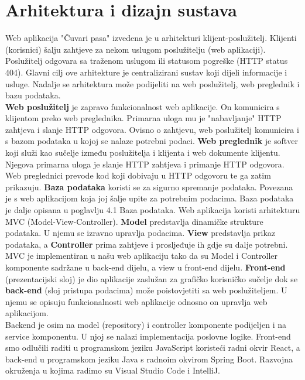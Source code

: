 \chapter{Arhitektura i dizajn sustava}

		Web aplikacija "Čuvari pasa" izvedena je u arhitekturi klijent-poslužitelj. Klijenti (korisnici) šalju zahtjeve za nekom uslugom poslužitelju (web aplikaciji). Poslužitelj odgovara sa traženom uslugom ili statusom pogreške (HTTP status 404). Glavni cilj ove arhitekture je centralizirani sustav koji dijeli informacije i usluge.
		Nadalje se arhitektura može podijeliti na web poslužitelj, web preglednik i bazu podataka.\\
		\newline
		\textbf{Web poslužitelj} je zapravo funkcionalnost web aplikacije. On komunicira s klijentom preko web preglednika. Primarna uloga mu je "nabavljanje" HTTP zahtjeva i slanje HTTP odgovora. Ovisno o zahtjevu, web poslužitelj komunicira i s bazom podataka u kojoj se nalaze potrebni podaci. 
		\newline
		\textbf{Web preglednik} je softver koji služi kao sučelje između poslužitelja i klijenta i web dokumente klijentu. Njegova primarna uloga je slanje HTTP zahtjeva i primanje HTTP odgovora. Web preglednici prevode kod koji dobivaju u HTTP odgovoru te ga zatim prikazuju.
		\newline
		\textbf{Baza podataka} koristi se za sigurno spremanje podataka. Povezana je s web aplikacijom koja joj šalje upite za potrebnim podacima. Baza podataka je dalje opisana u poglavlju 4.1 Baza podataka.
		\newline
		\newline
		Web aplikacija koristi arhitekturu MVC (Model-View-Controller). \textbf{Model} predstavlja dinamičke strukture podataka. U njemu se izravno upravlja podacima.
		\textbf{View} predstavlja prikaz podataka, a \textbf{Controller} prima zahtjeve i prosljeđuje ih gdje su dalje potrebni. MVC je implementiran u našu web aplikaciju tako da su Model i Controller komponente sadržane u back-end dijelu, a view u front-end dijelu. \textbf{Front-end} (prezentacijski sloj) je dio aplikacije zaslužan za grafičko korisničko sučelje dok se \textbf{back-end} (sloj pristupa podacima) može poistovjetiti sa web poslužiteljem. U njemu se opisuju funkcionalnosti web aplikacije odnosno on upravlja web aplikacijom.\\
		Backend je osim na model (repository) i controller komponente podijeljen i na service komponentu. U njoj se nalazi implementacija poslovne logike.
		\newline
		Front-end smo odlučili raditi u programskom jeziku JavaScript koristeći radni okvir React, a back-end u programskom jeziku Java s radnoim okvirom Spring Boot. Razvojna okruženja u kojima radimo su Visual Studio Code i IntelliJ.
		
